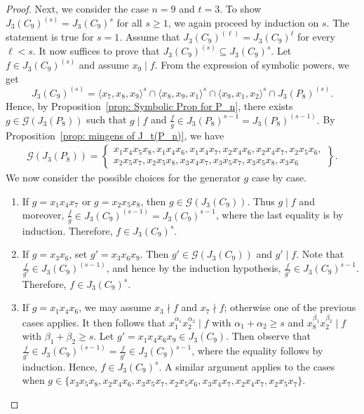 \documentclass[10pt,a4paper]{amsart}
\def\l{\langle}
\def\r{\rangle}
\begin{document}
\begin{proof}
Next, we consider the case $n=9$ and $t=3$. To show $J_3(C_9)^{(s)} = J_3(C_9)^s$ for all $s \ge 1$, we again proceed by induction on $s$. The statement is true for $s=1$. Assume that $J_3(C_9)^{(\ell)} = J_3(C_9)^{\ell}$ for every $\ell<s$. It now suffices to prove that $J_3(C_9)^{(s)} \subseteq J_3(C_9)^s.$ Let $f\in J_3(C_9)^{(s)}$ and assume $x_9\mid f$. From the expression of symbolic powers, we get
\[
J_3(C_9)^{(s)} = \l x_7,x_8,x_9 \r ^s
\cap \l x_8,x_9,x_1 \r ^s
\cap \l x_9,x_1,x_2\r ^s
\cap J_3(P_8)^{(s)}.
\]
Hence, by Proposition~\ref{prop: Symbolic Prop for P_n}, there exists
$g\in \mathcal{G}(J_3(P_8))$ such that
$g\mid f$ and $\frac{f}{g}\in J_3(P_8)^{s-1}
=J_3(P_8)^{(s-1)}.$ By Proposition~\ref{prop: mingens of J_t(P_n)}, we have
\begin{align*}   
\mathcal{G}(J_3(P_8)) = \left\lbrace
\begin{array}{c}
    x_1x_4x_5x_8, x_1x_4x_6, x_1x_4x_7, x_2x_4x_6,x_2x_4x_7,x_2x_5x_6, \\ [1mm]
    x_2x_5x_7,x_2x_5x_8,x_3x_4x_7,x_3x_5x_7,x_3x_5x_8,x_3x_6
\end{array}
\right\rbrace .
\end{align*}
We now consider the possible choices for the generator $g$ case by case.

\begin{enumerate}

\item If $g=x_1x_4x_7$ or $g=x_2x_5x_8$, then
$g\in \mathcal{G}(J_3(C_9))$.
Thus $g\mid f$ and moreover,
$\frac{f}{g}\in J_3(C_9)^{(s-1)}=J_3(C_9)^{s-1}$, where the last equality is by induction. Therefore, $f\in J_3(C_9)^s$.

\item If $g=x_3x_6$, set $g'=x_3x_6x_9$.
Then $g'\in \mathcal{G}(J_3(C_9))$ and $g'\mid f$.
Note that $\frac{f}{g'}\in J_3(C_9)^{(s-1)}$, and hence by the induction hypothesis, $\frac{f}{g'}\in J_3(C_9)^{s-1}$. Therefore, $f\in J_3(C_9)^s$.

\item If $g=x_1x_4x_6$, we may assume
$x_3\nmid f$ and $x_7\nmid f$; otherwise one of the previous cases applies. It then follows that
$x_1^{\alpha_1}x_2^{\alpha_2}\mid f$ with $\alpha_1+\alpha_2\ge s$ and $x_8^{\beta_1}x_2^{\beta_2}\mid f$ with $\beta_1+\beta_2\ge s$. Let $g'=x_1x_4x_6x_9\in J_3(C_9)$. Then observe that $\frac{f}{g'}\in J_3(C_9)^{(s-1)}=\frac{f}{g'}\in J_3(C_9)^{s-1}$, where the equality follows by induction. Hence, $f\in J_3(C_9)^s$. A similar argument applies to the cases when  $g\in \{ x_3x_5x_8, x_2x_4x_6, x_3x_5x_7, x_2x_5x_6, x_3x_4x_7, x_2x_4x_7, x_2x_5x_7\}$.


\end{enumerate}
\end{proof}
\end{document}
